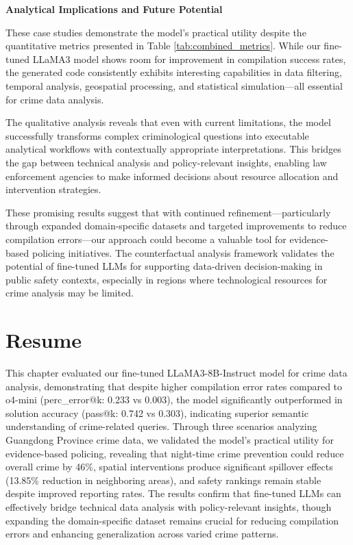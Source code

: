 \noindent \textbf{Analytical Implications and Future Potential}

These case studies demonstrate the model's practical utility despite the quantitative metrics presented in Table \ref{tab:combined_metrics}. While our fine-tuned LLaMA3 model shows room for improvement in compilation success rates, the generated code consistently exhibits interesting capabilities in data filtering, temporal analysis, geospatial processing, and statistical simulation—all essential for crime data analysis.

The qualitative analysis reveals that even with current limitations, the model successfully transforms complex criminological questions into executable analytical workflows with contextually appropriate interpretations. This bridges the gap between technical analysis and policy-relevant insights, enabling law enforcement agencies to make informed decisions about resource allocation and intervention strategies.

These promising results suggest that with continued refinement—particularly through expanded domain-specific datasets and targeted improvements to reduce compilation errors—our approach could become a valuable tool for evidence-based policing initiatives. The counterfactual analysis framework validates the potential of fine-tuned LLMs for supporting data-driven decision-making in public safety contexts, especially in regions where technological resources for crime analysis may be limited.


\section{Resume}

This chapter evaluated our fine-tuned LLaMA3-8B-Instruct model for crime data analysis, demonstrating that despite higher compilation error rates compared to o4-mini (perc\_error@k: 0.233 vs 0.003), the model significantly outperformed in solution accuracy (pass@k: 0.742 vs 0.303), indicating superior semantic understanding of crime-related queries. Through three scenarios analyzing Guangdong Province crime data, we validated the model's practical utility for evidence-based policing, revealing that night-time crime prevention could reduce overall crime by 46\%, spatial interventions produce significant spillover effects (13.85\% reduction in neighboring areas), and safety rankings remain stable despite improved reporting rates. The results confirm that fine-tuned LLMs can effectively bridge technical data analysis with policy-relevant insights, though expanding the domain-specific dataset remains crucial for reducing compilation errors and enhancing generalization across varied crime patterns.